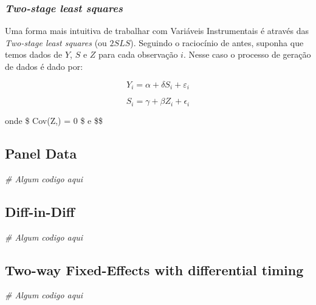 \documentclass[
]{article}
\newenvironment{Shaded}{\begin{snugshade}}{\end{snugshade}}
\newcommand{\CommentTok}[1]{\textcolor[rgb]{0.56,0.35,0.01}{\textit{#1}}}
\begin{document}
\hypertarget{two-stage-least-squares}{%
\subsubsection{\texorpdfstring{\emph{Two-stage least
squares}}{Two-stage least squares}}\label{two-stage-least-squares}}

Uma forma mais intuitiva de trabalhar com Variáveis Instrumentais é
através das \emph{Two-stage least squares} (ou \(2SLS\)). Seguindo o
raciocínio de antes, suponha que temos dados de \(Y\), \(S\) e \(Z\)
para cada observação \(i\). Nesse caso o processo de geração de dados é
dado por:

\[ Y_i = \alpha + \delta S_i + \varepsilon_i\]

\[ S_i = \gamma + \beta Z_i + \epsilon_i\]

onde \$ Cov(Z,\varepsilon) = 0 \$ e \$\beta \neqq \$

\newpage

\hypertarget{panel-data}{%
\subsection{Panel Data}\label{panel-data}}

\begin{Shaded}
\begin{Highlighting}[]
\CommentTok{\# Algum codigo aqui}
\end{Highlighting}
\end{Shaded}

\newpage

\hypertarget{diff-in-diff}{%
\subsection{Diff-in-Diff}\label{diff-in-diff}}

\begin{Shaded}
\begin{Highlighting}[]
\CommentTok{\# Algum codigo aqui}
\end{Highlighting}
\end{Shaded}

\newpage

\hypertarget{two-way-fixed-effects-with-differential-timing}{%
\subsection{Two-way Fixed-Effects with differential
timing}\label{two-way-fixed-effects-with-differential-timing}}

\begin{Shaded}
\begin{Highlighting}[]
\CommentTok{\# Algum codigo aqui}
\end{Highlighting}
\end{Shaded}
\end{document}
